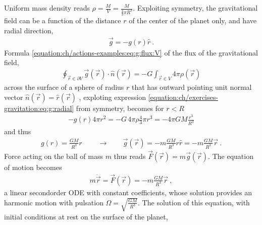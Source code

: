 \documentclass[letterpaper,10pt,english]{jupyterBook}
\begin{document}
\sphinxAtStartPar
Uniform mass density reads \(\rho = \frac{M}{V} = \frac{M}{\frac{4}{3}\pi R^3}\).
Exploiting symmetry, the gravitational field can be a function of the distance \(r\) of the center of the planet only, and have radial direction,
\begin{equation}\label{equation:ch/exercises-gravitation:eq:g:radial}
\begin{split}\vec{g} = - g(r) \hat{r} \ .\end{split}
\end{equation}
\sphinxAtStartPar
Formula \eqref{equation:ch/actions-examples:eq:g:flux:V} of the flux of the gravitational field,
\begin{equation*}
\begin{split}  \oint_{\vec{r} \in \partial V} \vec{g}(\vec{r}) \cdot \hat{n}(\vec{r}) = - G \int_{\vec{r} \in V} 4 \pi \rho(\vec{r}) \end{split}
\end{equation*}
\sphinxAtStartPar
across the surface of a sphere of radius \(r\) \sphinxhyphen{} that has outward pointing unit normal vector \(\hat{n}(\vec{r}) = \hat{r}(\vec{r})\) \sphinxhyphen{}, exploting expression \eqref{equation:ch/exercises-gravitation:eq:g:radial} from symmetry, becomes for \(r < R\)
\begin{equation*}
\begin{split}- g(r) 4 \pi r^2 = - G \, 4  \pi \rho \frac{4}{3} \pi r^3 = - 4 \pi G M \frac{r^3}{R^3}\end{split}
\end{equation*}
\sphinxAtStartPar
and thus
\begin{equation*}
\begin{split}g(r) = \frac{GM}{R^3} r \ \qquad \rightarrow \qquad \vec{g}(\vec{r}) = - m \frac{G M}{R^3} r \hat{r} = - m \frac{GM}{R^3} \vec{r} \ .\end{split}
\end{equation*}
\sphinxAtStartPar
Force acting on the ball of mass \(m\) thus reads \(\vec{F}(\vec{r}) = m \vec{g}(\vec{r})\). The equation of motion becomes
\begin{equation*}
\begin{split}m \ddot{\vec{r}} = \vec{F}(\vec{r}) = - m \frac{G M}{R^3} \vec{r} \ ,\end{split}
\end{equation*}
\sphinxAtStartPar
a linear second\sphinxhyphen{}order ODE with constant coefficients, whose solution provides an harmonic motion with pulsation \(\Omega = \sqrt{\frac{GM}{R^3}}\).
The solution of this equation, with initial conditions at rest on the surface of the planet,
\end{document}
